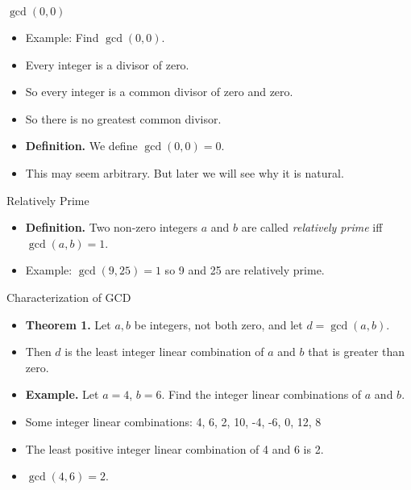 \documentclass[handout]{beamer}
\begin{document}

\begin{frame}{$\gcd(0,0)$}

\begin{itemize}
  \item Example: Find $\gcd(0,0)$.
  \item Every integer is a divisor of zero.
  \item So every integer is a common divisor of zero and zero.
  \item So there is no greatest common divisor.
  \item \textbf{Definition.} We define $\gcd(0,0)=0$.
  \item This may seem arbitrary. But later we will see why it is natural.
\end{itemize}

\end{frame}


\begin{frame}{Relatively Prime}

\begin{itemize}
  \item \textbf{Definition.} Two non-zero integers $a$ and $b$ are called
  \emph{relatively prime} iff $\gcd(a,b)=1$.
  \item Example: $\gcd(9,25) = 1$ so 9 and 25 are relatively prime.
\end{itemize}

\end{frame}


\begin{frame}{Characterization of GCD}

\begin{itemize}
  \item \textbf{Theorem 1.} Let $a,b$ be integers, not both zero, and let $d=\gcd(a,b)$.
  \item Then $d$ is the least integer linear combination of $a$ and $b$ that is greater than zero.
  \item \textbf{Example.} Let $a=4$, $b=6$. Find the integer linear combinations of $a$ and $b$.
  \item Some integer linear combinations: 4, 6, 2, 10, -4, -6, 0, 12, 8
  \item The least positive integer linear combination of 4 and 6 is 2.
  \item $\gcd(4,6)=2$.
\end{itemize}

\end{frame}
\end{document}
